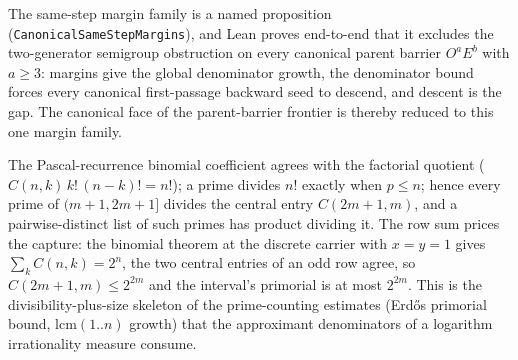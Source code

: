 \begin{theorem}
  \label{thm:collatz-canonical-margins-close-gap}
  \leanok
  The same-step margin family is a named proposition
  (\texttt{CanonicalSameStepMargins}), and Lean proves end-to-end that it
  excludes the two-generator semigroup obstruction on every canonical parent
  barrier \(O^a E^b\) with \(a\ge3\): margins give the global denominator
  growth, the denominator bound forces every canonical first-passage backward
  seed to descend, and descent is the gap. The canonical face of the
  parent-barrier frontier is thereby reduced to this one margin family.
\end{theorem}

\begin{theorem}
  \label{thm:nt-interval-primorial-central-column}
  \leanok
  The Pascal-recurrence binomial coefficient agrees with the factorial
  quotient (\(C(n,k)\,k!\,(n-k)! = n!\)); a prime divides \(n!\) exactly when
  \(p\le n\); hence every prime of \((m{+}1, 2m{+}1]\) divides the central
  entry \(C(2m{+}1,m)\), and a pairwise-distinct list of such primes has
  product dividing it. The row sum prices the capture: the binomial theorem
  at the discrete carrier with \(x=y=1\) gives \(\sum_k C(n,k)=2^n\), the two
  central entries of an odd row agree, so \(C(2m{+}1,m)\le 2^{2m}\) and the
  interval's primorial is at most \(2^{2m}\). This is the
  divisibility-plus-size skeleton of the prime-counting estimates
  (Erd\H{o}s primorial bound, \(\mathrm{lcm}(1..n)\) growth) that the
  approximant denominators of a logarithm irrationality measure consume.
\end{theorem}


